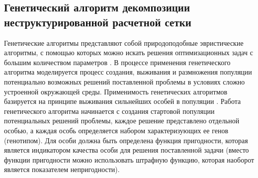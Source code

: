 \subsection{Генетический алгоритм декомпозиции \\ неструктурированной расчетной сетки}\label{sec:text_2_genetic}

\label{term:alg_decomp_gen}Генетические алгоритмы представляют собой природоподобные эвристические алгоритмы, с помощью которых можно искать решения оптимизационных задач с большим количеством параметров \cite{Chahar2021Gen,Wirayanti2025Gen}.
В процессе применения генетического алгоритма моделируется процесс создания, выживания и размножения популяции потенциально возможных решений поставленной проблемы в условиях сложно устроенной окружающей среды.
Применимость генетических алгоритмов базируется на принципе выживания сильнейших особей в популяции \cite{Naaman2025Gen}.
Работа генетического алгоритма начинается с создания стартовой популяции потенциальных решений проблемы, каждое решение представлено отдельной особью, а каждая особь определяется набором характеризующих ее генов (генотипом)\label{term:genotype}.
Для особи должна быть определена функция пригодности, которая является индикатором качества особи для решения поставленной задачи (вместо функции пригодности можно использовать штрафную функцию\label{term:penalty_function}, которая наоборот является показателем непригодности). 

